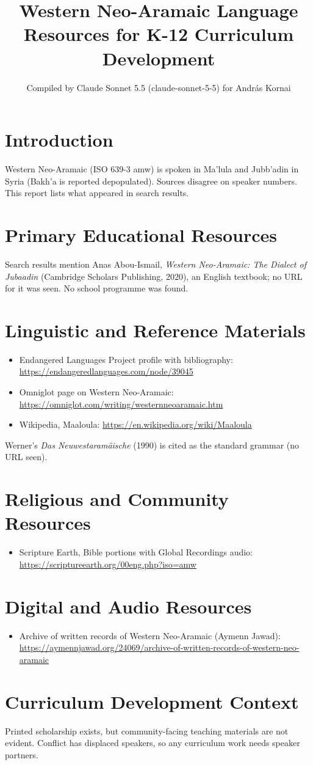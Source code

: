 \documentclass[12pt]{article}
\title{Western Neo-Aramaic Language Resources for K-12 Curriculum Development}
\author{Compiled by Claude Sonnet 5.5 (claude-sonnet-5-5) for Andr\'as Kornai}
\date{}
\begin{document}
\maketitle

\section{Introduction}
Western Neo-Aramaic (ISO 639-3 amw) is spoken in Ma'lula and Jubb'adin in Syria (Bakh'a is reported depopulated). Sources disagree on speaker numbers. This report lists what appeared in search results.

\section{Primary Educational Resources}
Search results mention Anas Abou-Ismail, \emph{Western Neo-Aramaic: The Dialect of Jubaadin} (Cambridge Scholars Publishing, 2020), an English textbook; no URL for it was seen. No school programme was found.

\section{Linguistic and Reference Materials}
\begin{itemize}
\item Endangered Languages Project profile with bibliography: \url{https://endangeredlanguages.com/node/39045}
\item Omniglot page on Western Neo-Aramaic: \url{https://omniglot.com/writing/westernneoaramaic.htm}
\item Wikipedia, Maaloula: \url{https://en.wikipedia.org/wiki/Maaloula}
\end{itemize}
Werner's \emph{Das Neuwestaram\"aische} (1990) is cited as the standard grammar (no URL seen).

\section{Religious and Community Resources}
\begin{itemize}
\item Scripture Earth, Bible portions with Global Recordings audio: \url{https://scriptureearth.org/00eng.php?iso=amw}
\end{itemize}

\section{Digital and Audio Resources}
\begin{itemize}
\item Archive of written records of Western Neo-Aramaic (Aymenn Jawad): \url{https://aymennjawad.org/24069/archive-of-written-records-of-western-neo-aramaic}
\end{itemize}

\section{Curriculum Development Context}
Printed scholarship exists, but community-facing teaching materials are not evident. Conflict has displaced speakers, so any curriculum work needs speaker partners.
\end{document}

